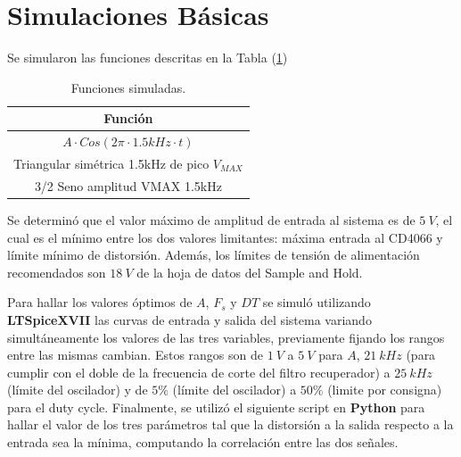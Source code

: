 


\section{Simulaciones Básicas}

Se simularon las funciones descritas en la Tabla (\ref{fn})

\begin{table}[H]
\centering
\begin{tabular}{@{}c@{}}
\toprule
Función \\ \midrule
$A\cdot Cos(2\pi \cdot 1.5kHz \cdot t)$ \\
Triangular simétrica 1.5kHz de pico $V_{MAX}$ \\
3/2 Seno amplitud VMAX 1.5kHz \\ \bottomrule
\end{tabular}
\caption{Funciones simuladas.}
\label{fn}
\end{table}

Se determinó que el valor máximo de amplitud de entrada al sistema es de $5 \ V$, el cual es el mínimo entre los dos valores limitantes: máxima entrada al CD4066 y límite mínimo de distorsión. Además, los límites de tensión de alimentación recomendados son $18 \ V$ de la hoja de datos del Sample and Hold.

Para hallar los valores óptimos de $A$, $F_s$ y $DT$ se simuló utilizando \textbf{LTSpiceXVII} las curvas de entrada y salida del sistema variando simultáneamente los valores de las tres variables, previamente fijando los rangos entre las mismas cambian. Estos rangos son de $1 \ V$ a $5 \ V$ para $A$, $21 \ kHz$ (para cumplir con el doble de la frecuencia de corte del filtro recuperador) a $25 \ kHz$ (límite del oscilador) y de $5\%$ (límite del oscilador) a $50\%$ (limite por consigna) para el duty cycle. Finalmente, se utilizó el siguiente script en \textbf{Python} para hallar el valor de los tres parámetros tal que la distorsión a la salida respecto a la entrada sea la mínima, computando la correlación entre las dos señales.
\begin{figure}[H]
\centering
\scalebox{0.75}{
}
\end{figure}

